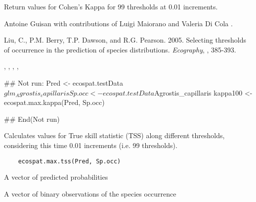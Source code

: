 \documentclass[a4paper]{book}
\begin{document}
%
\begin{Value}
Return values for Cohen's Kappa for 99 thresholds at 0.01 increments. 
\end{Value}
%
\begin{Author}\relax
Antoine Guisan  with contributions of Luigi Maiorano  and Valeria Di Cola .
\end{Author}
%
\begin{References}\relax
Liu, C., P.M. Berry, T.P. Dawson, and R.G. Pearson. 2005. Selecting thresholds of occurrence in the prediction of species distributions. \emph{Ecography}, , 385-393.

\end{References}
%
\begin{SeeAlso}\relax
{}, , , , 
\end{SeeAlso}
%
\begin{Examples}
\begin{ExampleCode}

   ## Not run: 
Pred <- ecospat.testData$glm_Agrostis_capillaris
Sp.occ <- ecospat.testData$Agrostis_capillaris
kappa100 <- ecospat.max.kappa(Pred, Sp.occ)
   
## End(Not run)

\end{ExampleCode}
\end{Examples}
%
\begin{Description}\relax
Calculates values for True skill statistic (TSS) along different thresholds, considering this time 0.01 increments (i.e. 99 thresholds).
\end{Description}
%
\begin{Usage}
\begin{verbatim}
    ecospat.max.tss(Pred, Sp.occ)
\end{verbatim}
\end{Usage}
%
\begin{Arguments}
\begin{ldescription}
\item[\code{Pred}] 
A vector of predicted probabilities

\item[\code{Sp.occ}] 
A vector of binary observations of the species occurrence

\end{ldescription}
\end{Arguments}
\end{document}
